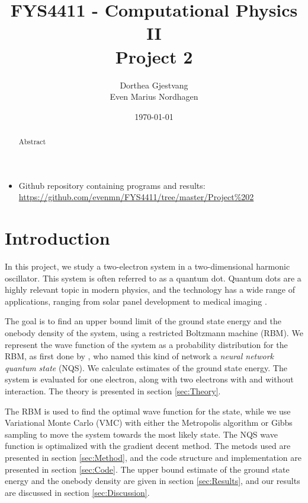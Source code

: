 \documentclass[norsk,a4paper,12pt]{article}
\title{FYS4411 - Computational Physics II\\\vspace{2mm} \Large{Project 2}}
\author{\large Dorthea Gjestvang\\ Even Marius Nordhagen}
\date\today
\begin{document}
\maketitle

\begin{itemize}
\item Github repository containing programs and results: \\\url{https://github.com/evenmn/FYS4411/tree/master/Project%202}
\end{itemize}

\begin{abstract}
Abstract
\par 

\end{abstract}

\newpage

\tableofcontents

\newpage

\section{Introduction} \label{sec:Introduction}
In this project, we study a two-electron system in a two-dimensional harmonic oscillator. This system is often referred to as a quantum dot. Quantum dots are a highly relevant topic in modern physics, and the technology has a wide range of applications, ranging from solar panel development to medical imaging \cite{Chilton}.
\par 
\vspace{3mm}

The goal is to find an upper bound limit of the ground state energy and the onebody density of the system, using a restricted Boltzmann machine (RBM). We represent the wave function of the system as a probability distribution for the RBM, as first done by \cite{Carleo}, who named this kind of network a \emph{neural network quantum state} (NQS). We calculate estimates of the ground state energy. The system is evaluated for one electron, along with two electrons with and without interaction. The theory is presented in section \ref{sec:Theory}.
\par 
\vspace{3mm}

The RBM is used to find the optimal wave function for the state, while we use Variational Monte Carlo (VMC) with either the Metropolis algorithm or Gibbs sampling to move the system towards the most likely state. The NQS wave function is optimalized with the gradient decent method.  The metods used are presented in section \ref{sec:Method}, and the code structure and implementation are presented in section \ref{sec:Code}. The upper bound estimate of the ground state energy and the onebody density are given in section \ref{sec:Results}, and our results are discussed in section \ref{sec:Discussion}.
\end{document}
